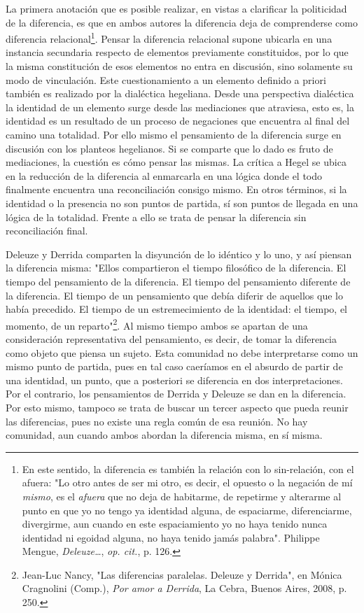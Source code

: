 \documentclass{book}
\begin{document}
La primera anotación que es posible realizar, en vistas a clarificar la
politicidad de la diferencia, es que en ambos autores la diferencia deja
de comprenderse como diferencia relacional\footnote{En este sentido, la
  diferencia es también la relación con lo sin-relación, con el afuera:
  "Lo otro antes de ser mi otro, es decir, el opuesto o la negación de
  mí \emph{mismo}, es el \emph{afuera} que no deja de habitarme, de
  repetirme y alterarme al punto en que yo no tengo ya identidad alguna,
  de espaciarme, diferenciarme, divergirme, aun cuando en este
  espaciamiento yo no haya tenido nunca identidad ni egoidad alguna, no
  haya tenido jamás palabra". Philippe Mengue, \emph{Deleuze\ldots{}},
  \emph{op. cit.}, p. 126.}. Pensar la diferencia relacional supone
ubicarla en una instancia secundaria respecto de elementos previamente
constituidos, por lo que la misma constitución de esos elementos no
entra en discusión, sino solamente su modo de vinculación. Este
cuestionamiento a un elemento definido a priori también es realizado por
la dialéctica hegeliana. Desde una perspectiva dialéctica la identidad
de un elemento surge desde las mediaciones que atraviesa, esto es, la
identidad es un resultado de un proceso de negaciones que encuentra al
final del camino una totalidad. Por ello mismo el pensamiento de la
diferencia surge en discusión con los planteos hegelianos. Si se
comparte que lo dado es fruto de mediaciones, la cuestión es cómo pensar
las mismas. La crítica a Hegel se ubica en la reducción de la diferencia
al enmarcarla en una lógica donde el todo finalmente encuentra una
reconciliación consigo mismo. En otros términos, si la identidad o la
presencia no son puntos de partida, sí son puntos de llegada en una
lógica de la totalidad. Frente a ello se trata de pensar la diferencia
sin reconciliación final.

Deleuze y Derrida comparten la disyunción de lo idéntico y lo uno, y así
piensan la diferencia misma: "Ellos compartieron el tiempo filosófico de
la diferencia. El tiempo del pensamiento de la diferencia. El tiempo del
pensamiento diferente de la diferencia. El tiempo de un pensamiento que
debía diferir de aquellos que lo había precedido. El tiempo de un
estremecimiento de la identidad: el tiempo, el momento, de un
reparto"\footnote{Jean-Luc Nancy, "Las diferencias paralelas. Deleuze y
  Derrida", en Mónica Cragnolini (Comp.), \emph{Por amor a Derrida}, La
  Cebra, Buenos Aires, 2008, p. 250.}. Al mismo tiempo ambos se apartan
de una consideración representativa del pensamiento, es decir, de tomar
la diferencia como objeto que piensa un sujeto. Esta comunidad no debe
interpretarse como un mismo punto de partida, pues en tal caso caeríamos
en el absurdo de partir de una identidad, un punto, que a posteriori se
diferencia en dos interpretaciones. Por el contrario, los pensamientos
de Derrida y Deleuze se dan en la diferencia. Por esto mismo, tampoco se
trata de buscar un tercer aspecto que pueda reunir las diferencias, pues
no existe una regla común de esa reunión. No hay comunidad, aun cuando
ambos abordan la diferencia misma, en sí misma.
\end{document}
